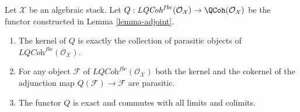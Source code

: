 \begin{lemma}
\label{lemma-adjoint-kernel-parasitic}
Let $\mathcal{X}$ be an algebraic stack.
Let $Q : \textit{LQCoh}^{fbc}(\mathcal{O}_\mathcal{X}) \to
\QCoh(\mathcal{O}_\mathcal{X})$
be the functor constructed in Lemma \ref{lemma-adjoint}.
\begin{enumerate}
\item The kernel of $Q$ is exactly the collection of parasitic objects
of $\textit{LQCoh}^{fbc}(\mathcal{O}_\mathcal{X})$.
\item For any object $\mathcal{F}$
of $\textit{LQCoh}^{fbc}(\mathcal{O}_\mathcal{X})$ both the kernel and the
cokernel of the
adjunction map $Q(\mathcal{F}) \to \mathcal{F}$ are parasitic.
\item The functor $Q$ is exact and commutes with all limits and colimits.
\end{enumerate}
\end{lemma}

